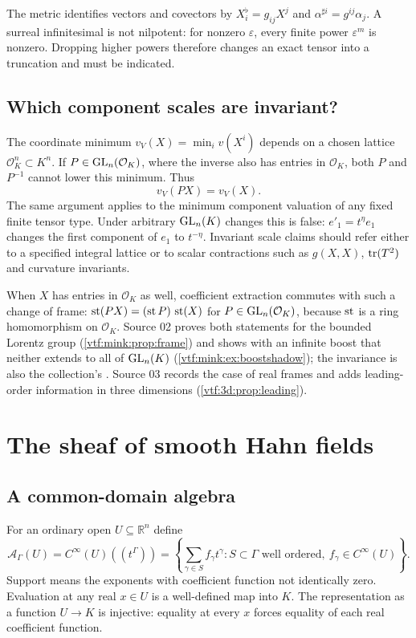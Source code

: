 \documentclass[11pt,letterpaper]{article}
\theoremstyle{definition}
\theoremstyle{remark}
\newcommand{\R}{\mathbb R}\newcommand{\C}{\mathbb C}
\newcommand{\A}{\mathscr A}\newcommand{\OO}{\mathcal O}\newcommand{\mm}{\mathfrak m}
\newcommand{\eps}{\varepsilon}
\begin{document}
The metric identifies vectors and covectors by
$X^\flat_i=g_{ij}X^j$ and $\alpha^{\sharp i}=g^{ij}\alpha_j$.
A surreal infinitesimal is not nilpotent: for nonzero $\eps$, every finite
power $\eps^m$ is nonzero. Dropping higher powers therefore changes an exact
tensor into a truncation and must be indicated.

\subsection{Which component scales are invariant?}

The coordinate minimum $v_V(X)=\min_i v(X^i)$ depends on a chosen lattice
$\OO_K^n\subset K^n$. If $P\in\GL_n(\OO_K)$, where the inverse also has
entries in $\OO_K$, both $P$ and $P^{-1}$ cannot lower this minimum. Thus
\[
 v_V(PX)=v_V(X).
\]
The same argument applies to the minimum component valuation of any fixed
finite tensor type. Under arbitrary $\operatorname{GL}_n(K)$ changes this is false:
$e'_1=t^\eta e_1$ changes the first component of $e_1$ to $t^{-\eta}$.
Invariant scale claims should refer either to a specified integral lattice or
to scalar contractions such as $g(X,X)$, $\operatorname{tr}(T^2)$ and curvature invariants.

When $X$ has entries in $\OO_K$ as well, coefficient extraction commutes with
such a change of frame: $\operatorname{st}(PX)=(\operatorname{st} P)\,\operatorname{st}(X)$ for $P\in\GL_n(\OO_K)$,
because $\operatorname{st}$ is a ring homomorphism on $\OO_K$. Source 02 proves both
statements for the bounded Lorentz group (\cref{vtf:mink:prop:frame}) and shows
with an infinite boost that neither extends to all of $\operatorname{GL}_n(K)$
(\cref{vtf:mink:ex:boostshadow}); the invariance is also the collection's
. Source 03 records the case of real frames and adds
leading-order information in three dimensions (\cref{vtf:3d:prop:leading}).

\section{The sheaf of smooth Hahn fields}\label{vtf:sec:sheaf}

\subsection{A common-domain algebra}

For an ordinary open $U\subseteq\R^n$ define
\begin{equation}\label{vtf:eq:A}
 \A_\Gamma(U)=C^\infty(U)((t^\Gamma))
 =\left\{\sum_{\gamma\in S}f_\gamma t^\gamma:
 S\subset\Gamma\text{ well ordered},\ f_\gamma\in C^\infty(U)\right\}.
\end{equation}
Support means the exponents with coefficient function not identically zero.
Evaluation at any real $x\in U$ is a well-defined map into $K$.
The representation as a function $U\to K$ is injective: equality at every
$x$ forces equality of each real coefficient function.
\end{document}
